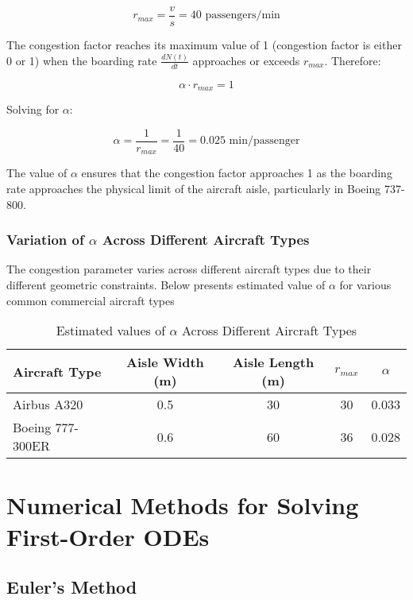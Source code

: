 \documentclass[12pt]{article}
\begin{document}
\begin{equation*}
r_{max} = \frac{v}{s} = 40 \text{ passengers/min}
\end{equation*}

The congestion factor reaches its maximum value of 1 (congestion factor is either 0 or 1) when the boarding rate $\frac{dN(t)}{dt}$ approaches or exceeds $r_{max}$. Therefore:

\begin{equation*}
\alpha \cdot r_{max} = 1
\end{equation*}

Solving for $\alpha$:

\begin{equation*}
\alpha = \frac{1}{r_{max}} = \frac{1}{40} = 0.025 \text{ min/passenger}
\end{equation*}

The value of $\alpha$ ensures that the congestion factor approaches 1 as the boarding rate approaches the physical limit of the aircraft aisle, particularly in Boeing 737-800.

\subsubsection{Variation of $\alpha$ Across Different Aircraft Types}

The congestion parameter varies across different aircraft types due to their different geometric constraints. Below presents estimated value of $\alpha$ for various common commercial aircraft types

\begin{table}[h]
\centering
\caption{Estimated values of $\alpha$ Across Different Aircraft Types}
\begin{tabular}{lcccc}
\toprule
\textbf{Aircraft Type} & \textbf{Aisle Width (m)} & \textbf{Aisle Length (m)} & $r_{max}$ & $\alpha$ \\
\midrule
Airbus A320 & 0.5 & 30 & 30 & 0.033 \\
Boeing 777-300ER & 0.6 & 60 & 36 & 0.028 \\
\bottomrule
\end{tabular}
\label{tab:alpha_values}
\end{table}

\section{Numerical Methods for Solving First-Order ODEs}
\subsection{Euler's Method}
\end{document}

